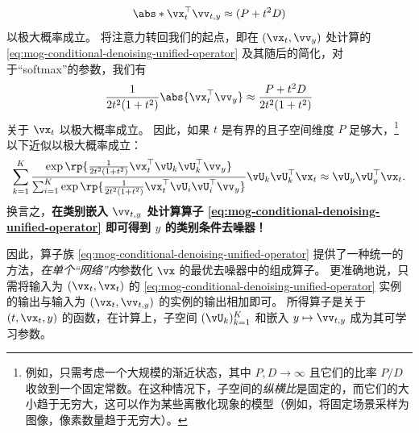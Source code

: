 \documentclass[../../book-main_zh.tex]{subfiles}
\begin{document}
\begin{example}
\begin{equation*}
        \abs*{\vx_t^\top \vv_{t,y}}
        \approx
        (P + t^2 D)
    \end{equation*}
    以极大概率成立。
    将注意力转回我们的起点，即在 $(\vx_t,
    \vv_y)$ 处计算的 \eqref{eq:mog-conditional-denoising-unified-operator} 及其随后的简化，对于“softmax”的参数，我们有
    \begin{equation*}
        {\frac{1}{2t^{2}(1 + t^{2})}\abs{\vx_t^\top \vv_y}}
        \approx
        \frac{P + t^2 D}{2t^{2}(1 + t^{2})}
    \end{equation*}
    关于 $\vx_t$ 以极大概率成立。
    因此，如果 $t$ 是有界的且子空间维度 $P$ 足够大，\footnote{例如，只需考虑一个大规模的渐近状态，其中 $P, D \to \infty$ 且它们的比率
        $P/D$ 收敛到一个固定常数。在这种情况下，子空间的\textit{纵横比}是固定的，而它们的大小趋于无穷大，这可以作为某些离散化现象的模型（例如，将固定场景采样为图像，像素数量趋于无穷大）。}
    以下近似以极大概率成立：
    \begin{equation}
        \sum_{k = 1}^{K}
        \frac{
            \exp\rp{\frac{1}{2t^{2}(1
            + t^{2})}\vx_t^\top \vU_k \vU_k^\top \vv_y}
        }
        {
            \sum_{i
            = 1}^{K}\exp\rp{\frac{1}{2t^{2}(1
            + t^{2})}\vx_t^\top \vU_i \vU_i^\top \vv_y}
        }
        \vU_{k}\vU_{k}^{\top}\vx_t
        \approx
        \vU_{y}\vU_{y}^{\top}\vx_t.
    \end{equation}
    换言之，\textbf{在类别嵌入 $\vv_{t, y}$ 处计算算子
        \eqref{eq:mog-conditional-denoising-unified-operator} 即可得到 $y$ 的类别条件去噪器！}

    因此，算子族
    \eqref{eq:mog-conditional-denoising-unified-operator}
    提供了一种统一的方法，\textit{在单个“网络”内}参数化 $\vx$ 的最优去噪器中的组成算子。
    更准确地说，只需将输入为 $(\vx_t,
    \vx_t)$ 的 \eqref{eq:mog-conditional-denoising-unified-operator} 实例的输出与输入为 $(\vx_t, \vv_{t, y})$ 的实例的输出相加即可。
    所得算子是关于 $(t, \vx_t, y)$ 的函数，在计算上，子空间
    $(\vU_k)_{k=1}^K$ 和嵌入 $y \mapsto \vv_{t, y}$ 成为其可学习参数。
\end{example}
\end{document}
